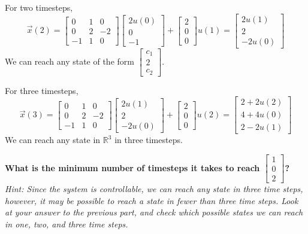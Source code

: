 \begin{enumerate}[resume]
{    For two timesteps,
    \[\vec{x}(2) = 
    \begin{bmatrix}
        0 & 1 & 0 \\
        0 & 2 & -2 \\
        -1 & 1 & 0
    \end{bmatrix} 
    \begin{bmatrix} 
        2u(0) \\ 0 \\ -1 
    \end{bmatrix}
    + \begin{bmatrix}
        2 \\ 0 \\ 0
    \end{bmatrix} u(1) =
    \begin{bmatrix} 
        2u(1) \\ 2 \\ -2u(0) 
    \end{bmatrix}\]
    We can reach any state of the form $\begin{bmatrix} c_1 \\ 2 \\ c_2 \end{bmatrix}$. \\
    \newline

    For three timesteps,
    \[\vec{x}(3) = 
    \begin{bmatrix}
        0 & 1 & 0 \\
        0 & 2 & -2 \\
        -1 & 1 & 0
    \end{bmatrix} 
    \begin{bmatrix} 
        2u(1) \\ 2 \\ -2u(0) 
    \end{bmatrix}
    + \begin{bmatrix}
        2 \\ 0 \\ 0
    \end{bmatrix} u(2) =
    \begin{bmatrix} 
        2 + 2u(2) \\ 4 + 4u(0) \\ 2 - 2u(1) 
    \end{bmatrix}\] 
    We can reach any state in $\mathbb{R}^3$ in three timesteps.
  }

  \qitem \textbf{What is the minimum number of timesteps it takes to reach $\begin{bmatrix} 1 \\ 0 \\ 2 \end{bmatrix}$?} \\
    \textit{Hint: 
      Since the system is controllable, we can reach any state in three time steps, however, it may be possible to reach a state in fewer than three time steps. Look at your answer to the previous part, and check which possible states we can reach in one, two, and three time steps.
    }


\end{enumerate}
